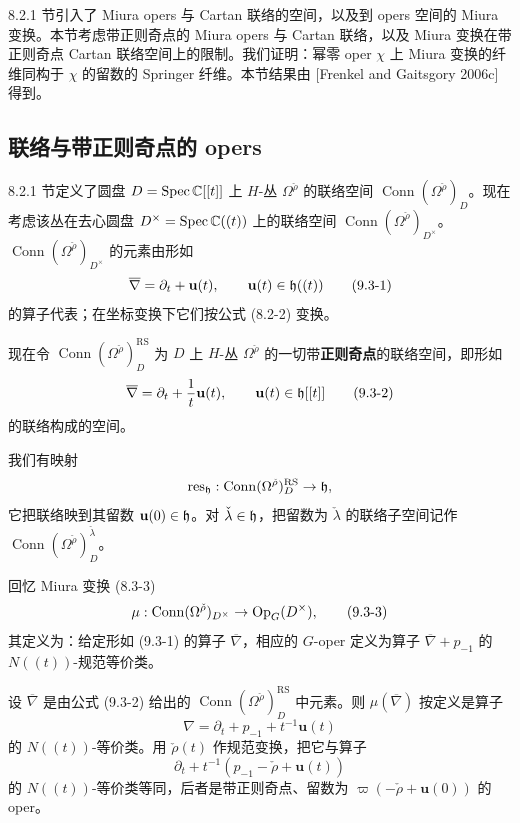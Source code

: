 8.2.1 节引入了 Miura opers 与 Cartan 联络的空间，以及到 opers 空间的 Miura 变换。本节考虑带正则奇点的 Miura opers 与 Cartan 联络，以及 Miura 变换在带正则奇点 Cartan 联络空间上的限制。我们证明：幂零 oper $\chi$ 上 Miura 变换的纤维同构于 $\chi$ 的留数的 Springer 纤维。本节结果由 [Frenkel and Gaitsgory 2006c] 得到。

\subsection{联络与带正则奇点的 opers}

8.2.1 节定义了圆盘 $D=\operatorname{Spec}\mathbb{C}[[t]]$ 上 $H$-丛 $\Omega^{\check\rho}$ 的联络空间 $\operatorname{Conn}(\Omega^{\check\rho})_D$。现在考虑该丛在去心圆盘 $D^\times = \operatorname{Spec}\mathbb{C}((t))$ 上的联络空间 $\operatorname{Conn}(\Omega^{\check\rho})_{D^\times}$。$\operatorname{Conn}(\Omega^{\check\rho})_{D^\times}$ 的元素由形如
\begin{equation}
\overline{\nabla} = \partial_t + \mathbf{u}(t),\qquad \mathbf{u}(t)\in\mathfrak{h}((t))
\tag{9.3-1}
\end{equation}
的算子代表；在坐标变换下它们按公式 (8.2-2) 变换。

现在令 $\operatorname{Conn}(\Omega^{\check\rho})^{\mathrm{RS}}_D$ 为 $D$ 上 $H$-丛 $\Omega^{\check\rho}$ 的一切带\textbf{正则奇点}的联络空间，即形如
\begin{equation}
\overline{\nabla} = \partial_t + \frac{1}{t}\mathbf{u}(t),\qquad \mathbf{u}(t)\in\mathfrak{h}[[t]]
\tag{9.3-2}
\end{equation}
的联络构成的空间。

我们有映射
\[
\operatorname{res}_{\mathfrak{h}}: \operatorname{Conn}(\Omega^{\check\rho})^{\mathrm{RS}}_D\to\mathfrak{h},
\]
它把联络映到其留数 $\mathbf{u}(0)\in\mathfrak{h}$。对 $\check\lambda\in\mathfrak{h}$，把留数为 $\check\lambda$ 的联络子空间记作 $\operatorname{Conn}(\Omega^{\check\rho})^{\check\lambda}_D$。

回忆 Miura 变换 (8.3-3)
\begin{equation}
\mu: \operatorname{Conn}(\Omega^{\check\rho})_{D^\times}\to\operatorname{Op}_G(D^\times),
\tag{9.3-3}
\end{equation}
其定义为：给定形如 (9.3-1) 的算子 $\overline{\nabla}$，相应的 $G$-oper 定义为算子 $\overline{\nabla}+p_{-1}$ 的 $N((t))$-规范等价类。

设 $\overline{\nabla}$ 是由公式 (9.3-2) 给出的 $\operatorname{Conn}(\Omega^{\check\rho})^{\mathrm{RS}}_D$ 中元素。则 $\mu(\overline{\nabla})$ 按定义是算子
\[
\nabla = \partial_t + p_{-1} + t^{-1}\mathbf{u}(t)
\]
的 $N((t))$-等价类。用 $\check\rho(t)$ 作规范变换，把它与算子
\[
\partial_t + t^{-1}(p_{-1}-\check\rho+\mathbf{u}(t))
\]
的 $N((t))$-等价类等同，后者是带正则奇点、留数为 $\varpi(-\check\rho+\mathbf{u}(0))$ 的 oper。

